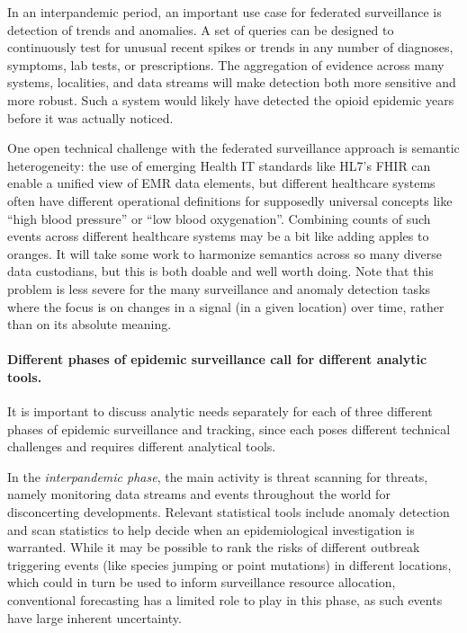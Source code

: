 \documentclass{article}
\begin{document}
In an interpandemic period, an important use case for federated surveillance is
detection of trends and anomalies.  A set of queries can be designed to
continuously test for unusual recent spikes or trends in any number of
diagnoses, symptoms, lab tests, or prescriptions.  The aggregation of evidence
across many systems, localities, and data streams will make detection both more
sensitive and more robust.  Such a system would likely have detected the opioid
epidemic years before it was actually noticed.

One open technical challenge with the federated surveillance approach is
semantic heterogeneity: the use of emerging Health IT standards like HL7's FHIR
\citep{HL7FHIR} can enable a unified view of EMR data elements, but different 
healthcare systems often have different operational definitions for supposedly
universal concepts like ``high blood pressure'' or ``low blood oxygenation''.
Combining counts of such events across different healthcare systems may be a bit
like adding apples to oranges.  It will take some work to harmonize semantics
across so many diverse data custodians, but this is both doable and well worth
doing.  Note that this problem is less severe for the many surveillance and
anomaly detection tasks where the focus is on changes in a signal (in a given
location) over time, rather than on its absolute meaning. 

\paragraph{Different phases of epidemic surveillance call for different analytic
  tools.}

It is important to discuss analytic needs separately for each of three different 
phases of epidemic surveillance and tracking, since each poses different
technical challenges and requires different analytical tools.

In the \emph{interpandemic phase}, the main activity is threat scanning for
threats, namely monitoring data streams and events throughout the world for
disconcerting developments.  Relevant statistical tools include anomaly
detection and scan statistics to help decide when an epidemiological
investigation is warranted.  While it may be possible to rank the risks of
different outbreak triggering events (like species jumping or point mutations)
in different locations, which could in turn be used to inform surveillance
resource allocation, conventional forecasting has a limited role to play in this
phase, as such events have large inherent uncertainty.  
\end{document}
